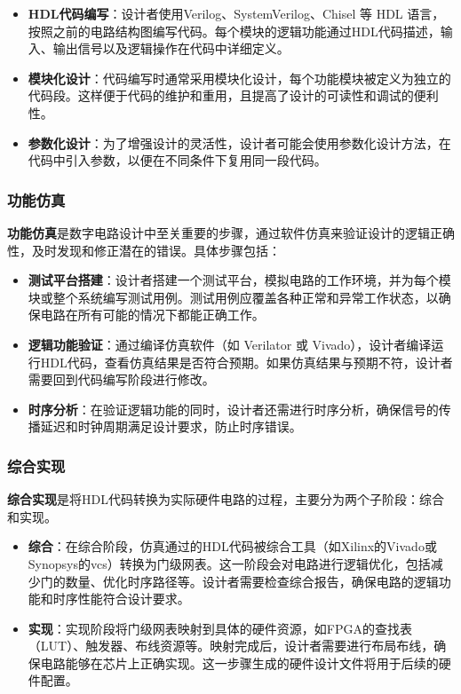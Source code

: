 \begin{itemize}
\tightlist
\item
  \textbf{HDL代码编写}：设计者使用Verilog、SystemVerilog、Chisel 等 HDL 语言，按照之前的电路结构图编写代码。每个模块的逻辑功能通过HDL代码描述，输入、输出信号以及逻辑操作在代码中详细定义。
\item
  \textbf{模块化设计}：代码编写时通常采用模块化设计，每个功能模块被定义为独立的代码段。这样便于代码的维护和重用，且提高了设计的可读性和调试的便利性。
\item
  \textbf{参数化设计}：为了增强设计的灵活性，设计者可能会使用参数化设计方法，在代码中引入参数，以便在不同条件下复用同一段代码。
\end{itemize}

\subsubsection{功能仿真}\label{sec:03-digital-logic-008}

\textbf{功能仿真}是数字电路设计中至关重要的步骤，通过软件仿真来验证设计的逻辑正确性，及时发现和修正潜在的错误。具体步骤包括：

\begin{itemize}
\tightlist
\item
  \textbf{测试平台搭建}：设计者搭建一个测试平台，模拟电路的工作环境，并为每个模块或整个系统编写测试用例。测试用例应覆盖各种正常和异常工作状态，以确保电路在所有可能的情况下都能正确工作。
\item
  \textbf{逻辑功能验证}：通过编译仿真软件（如 Verilator 或 Vivado），设计者编译运行HDL代码，查看仿真结果是否符合预期。如果仿真结果与预期不符，设计者需要回到代码编写阶段进行修改。
\item
  \textbf{时序分析}：在验证逻辑功能的同时，设计者还需进行时序分析，确保信号的传播延迟和时钟周期满足设计要求，防止时序错误。
\end{itemize}

\subsubsection{综合实现}\label{sec:03-digital-logic-009}

\textbf{综合实现}是将HDL代码转换为实际硬件电路的过程，主要分为两个子阶段：综合和实现。

\begin{itemize}
\tightlist
\item
  \textbf{综合}：在综合阶段，仿真通过的HDL代码被综合工具（如Xilinx的Vivado或Synopsys的vcs）转换为门级网表。这一阶段会对电路进行逻辑优化，包括减少门的数量、优化时序路径等。设计者需要检查综合报告，确保电路的逻辑功能和时序性能符合设计要求。
\item
  \textbf{实现}：实现阶段将门级网表映射到具体的硬件资源，如FPGA的查找表（LUT）、触发器、布线资源等。映射完成后，设计者需要进行布局布线，确保电路能够在芯片上正确实现。这一步骤生成的硬件设计文件将用于后续的硬件配置。
\end{itemize}

